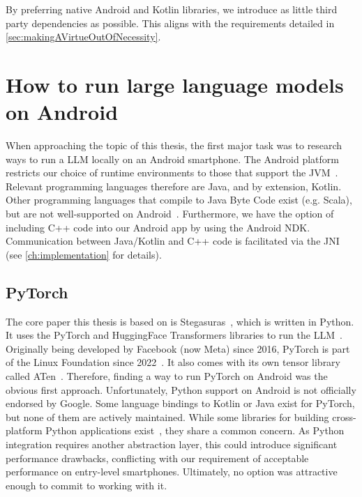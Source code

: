By preferring native Android and Kotlin libraries, we introduce as little third party dependencies as possible. This aligns with the requirements detailed in \cref{sec:makingAVirtueOutOfNecessity}.

\section{How to run large language models on Android}
\label{sec:howToRunLLMsOnAndroid}
When approaching the topic of this thesis, the first major task was to research ways to run a \gls{LLM} locally on an Android smartphone. The Android platform restricts our choice of runtime environments to those that support the \gls{JVM}~\cite{ruggiaDarkSideNative2025}. Relevant programming languages therefore are Java, and by extension, Kotlin. Other programming languages that compile to Java Byte Code exist (e.g. Scala), but are not well-supported on Android~\cite{ruggiaDarkSideNative2025}. Furthermore, we have the option of including C++ code into our Android app by using the Android \gls{NDK}. Communication between Java/Kotlin and C++ code is facilitated via the \gls{JNI}~\cite{ruggiaDarkSideNative2025} (see \cref{ch:implementation} for details).

\subsection{PyTorch}
\label{sec:pyTorch}
The core paper this thesis is based on is Stegasuras~\cite{zieglerNeuralLinguisticSteganography2019}, which is written in Python. It uses the PyTorch and HuggingFace Transformers libraries to run the \gls{LLM}~\cite{zieglerStegasuras2025,anselPyTorch2Faster2024,wolfTransformersStateoftheArtNatural2020}. Originally being developed by Facebook (now Meta) since 2016, PyTorch is part of the Linux Foundation since 2022~\cite{chintalaPyTorchStrengthensIts2022}. It also comes with its own tensor library called ATen~\cite{devitoZdevitoATen2025}. Therefore, finding a way to run PyTorch on Android was the obvious first approach. Unfortunately, Python support on Android is not officially endorsed by Google. Some language bindings to Kotlin or Java exist for PyTorch, but none of them are actively maintained. While some libraries for building cross-platform Python applications exist~\cite{kivyKivyKivy2025,beewareBeewareToga2025,chaquoChaquoChaquopy2025}, they share a common concern. As Python integration requires another abstraction layer, this could introduce significant performance drawbacks, conflicting with our requirement of acceptable performance on entry-level smartphones. Ultimately, no option was attractive enough to commit to working with it.

